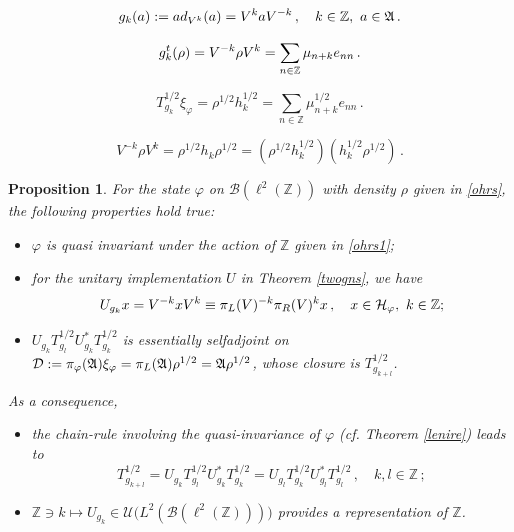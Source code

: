 \documentclass[10pt,a4paper]{amsart}
\newtheorem{prop}{Proposition}
\def\bz{{\mathbb Z}}
\def\cb{{\mathcal B}}
\def\cd{{\mathcal D}}
\def\cu{{\mathcal U}}
\def\f{\varphi}\def\ff{\phi} \def\F{\Phi}
\def\ga{{\mathfrak A}} \def\gpa{{\mathfrak a}}
\def\r{\rho}\def\R{\mathop{\rm P}}
\begin{document}
\begin{equation}
\label{ohrs1}
g_k(a):={\rm ad}_{V^k}(a)=V^{k}aV^{-k}\,,\quad k\in\mathbb Z,\,\,a\in\ga\,. 
\end{equation}

\begin{equation}
\label{dual}
g_k^{\rm t}(\r)=
V^{-k}\rho V^k=\sum_{n\in\mathbb Z}\mu_{n+k}e_{nn}\,.
\end{equation}

\begin{equation}
\label{norm1}
T^{1/2}_{g_k}\xi_\f=\rho^{1/2}h_k^{1/2}=																\sum_{n\in\mathbb Z}\mu_{n+k}^{1/2}e_{nn}\,.
\end{equation}

\begin{equation}
\label{rhok}
V^{-k}\rho V^k=\rho^{1/2}h_k\rho^{1/2}=(\rho^{1/2}h_k^{1/2})(h_k^{1/2}\rho^{1/2})\,.
\end{equation}

\begin{prop}
For the state $\f$ on $\cb(\ell^2(\bz))$ with density $\r$ given in \eqref{ohrs}, the following properties hold true:
\begin{itemize}
\item[(i)] $\f$ is quasi invariant under the action of $\bz$ given in \eqref{ohrs1};
\item[(ii)] for the unitary implementation $U$ in Theorem \ref{twogns}, we have
\begin{eqnarray*}
U_{g_k}x=V^{-k}xV^k\equiv\pi_{\rm L}(V)^{-k}\pi_{\rm R}(V)^{k}x\,,\quad x\in\mathcal H_\f,\,\,k\in\mathbb Z;
\end{eqnarray*}
\item[(iii)] $U_{g_k}T_{g_l}^{1/2}U_{g_k}^*T_{g_k}^{1/2}$ is essentially selfadjoint on 
$\cd:=\pi_\f(\ga)\xi_\f=\pi_{\rm L}(\ga)\r^{1/2}=\ga\r^{1/2}$, whose closure is $T_{g_{k+l}}^{1/2}$.
\end{itemize}
As a consequence, 
\begin{itemize}
\item[(1)] the chain-rule involving the quasi-invariance of $\f$ (cf. Theorem \ref{lenire}) leads to
$$
T_{g_{k+l}}^{1/2}=U_{g_k}T_{g_l}^{1/2}U_{g_k}^*T_{g_k}^{1/2}
=U_{g_l}T_{g_k}^{1/2}U_{g_l}^*T_{g_l}^{1/2}\,,\quad k,l\in\bz\,;
$$
\item[(2)] $\bz\ni k\mapsto U_{g_k}\in\cu\big(L^2(\cb(\ell^2(\bz)))\big)$ provides a representation of $\bz$.
\end{itemize}
\end{prop}
\end{document}
